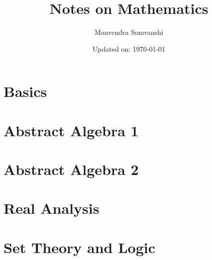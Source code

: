 \documentclass[11pt,a4paper]{colorart}
\numberwithin{equation}{section}
\begin{document}
\title{\Huge Notes on Mathematics}
\author{Manvendra Somvanshi} 
\date{Updated on: \today} 
\maketitle
\tableofcontents
\newpage
\part{Basics}




\newpage
\part{Abstract Algebra \rm{1}}









\newpage
\part{Abstract Algebra \rm{2}}


\newpage
\part{Real Analysis}







\newpage
\part{Set Theory and Logic}



\newpage
\end{document}
